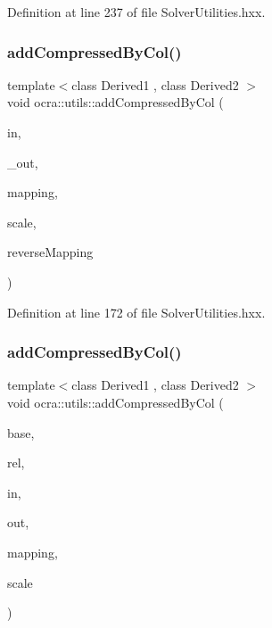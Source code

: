 Definition at line 237 of file Solver\+Utilities.\+hxx.

\hypertarget{namespaceocra_1_1utils_a4a6965e28f8a5284f406ca2cea54a221}{}\label{namespaceocra_1_1utils_a4a6965e28f8a5284f406ca2cea54a221} 
\subsubsection{\texorpdfstring{add\+Compressed\+By\+Col()}{addCompressedByCol()}\hspace{0.1cm}{\footnotesize\ttfamily [1/2]}}
{\footnotesize\ttfamily template$<$class Derived1 , class Derived2 $>$ \\
void ocra\+::utils\+::add\+Compressed\+By\+Col (\begin{DoxyParamCaption}\item[{const Matrix\+Base$<$ Derived1 $>$ \&}]{in,  }\item[{Matrix\+Base$<$ Derived2 $>$ const \&}]{\+\_\+out,  }\item[{const std\+::vector$<$ int $>$ \&}]{mapping,  }\item[{double}]{scale,  }\item[{bool}]{reverse\+Mapping }\end{DoxyParamCaption})\hspace{0.3cm}{\ttfamily [inline]}}



Definition at line 172 of file Solver\+Utilities.\+hxx.

\hypertarget{namespaceocra_1_1utils_a8b6a78df5f205a61d8b4d29a2a82c864}{}\label{namespaceocra_1_1utils_a8b6a78df5f205a61d8b4d29a2a82c864} 
\subsubsection{\texorpdfstring{add\+Compressed\+By\+Col()}{addCompressedByCol()}\hspace{0.1cm}{\footnotesize\ttfamily [2/2]}}
{\footnotesize\ttfamily template$<$class Derived1 , class Derived2 $>$ \\
void ocra\+::utils\+::add\+Compressed\+By\+Col (\begin{DoxyParamCaption}\item[{const \hyperlink{classocra_1_1Variable}{Variable} \&}]{base,  }\item[{const \hyperlink{classocra_1_1Variable}{Variable} \&}]{rel,  }\item[{const Matrix\+Base$<$ Derived1 $>$ \&}]{in,  }\item[{Matrix\+Base$<$ Derived2 $>$ const \&}]{out,  }\item[{std\+::vector$<$ int $>$ \&}]{mapping,  }\item[{double}]{scale }\end{DoxyParamCaption})\hspace{0.3cm}{\ttfamily [inline]}}



